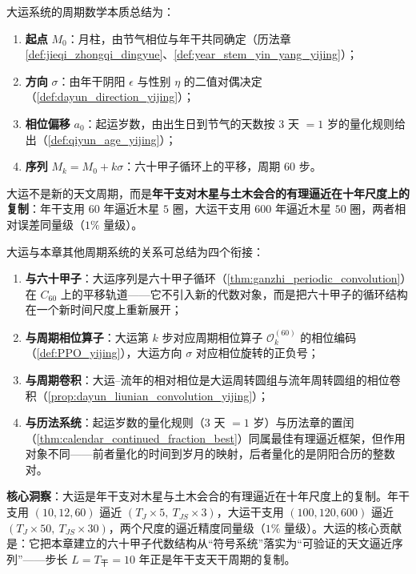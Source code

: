 \begin{remark}[大运系统的周期数学本质]\label{rem:dayun_math_essence_yijing}
大运系统的周期数学本质总结为：
\begin{enumerate}[label=(\roman*)]
    \item \textbf{起点} $M_0$：月柱，由节气相位与年干共同确定（历法章 \cref{def:jieqi_zhongqi_dingyue}、\cref{def:year_stem_yin_yang_yijing}）；
    \item \textbf{方向} $\sigma$：由年干阴阳 $\epsilon$ 与性别 $\eta$ 的二值对偶决定（\cref{def:dayun_direction_yijing}）；
    \item \textbf{相位偏移} $a_0$：起运岁数，由出生日到节气的天数按 $3$ 天 $=1$ 岁的量化规则给出（\cref{def:qiyun_age_yijing}）；
    \item \textbf{序列} $M_k=M_0+k\sigma$：六十甲子循环上的平移，周期 $60$ 步。
\end{enumerate}
大运不是新的天文周期，而是\textbf{年干支对木星与土木会合的有理逼近在十年尺度上的复制}：年干支用 $60$ 年逼近木星 $5$ 圈，大运干支用 $600$ 年逼近木星 $50$ 圈，两者相对误差同量级（$1\%$ 量级）。
\end{remark}

\begin{remark}[大运与本章其他周期体系的衔接]\label{rem:dayun_relation_to_yijing}
大运与本章其他周期系统的关系可总结为四个衔接：
\begin{enumerate}[label=(\roman*)]
    \item \textbf{与六十甲子}：大运序列是六十甲子循环（\cref{thm:ganzhi_periodic_convolution}）在 $C_{60}$ 上的平移轨道——它不引入新的代数对象，而是把六十甲子的循环结构在一个新时间尺度上重新展开；
    \item \textbf{与周期相位算子}：大运第 $k$ 步对应周期相位算子 $\mathcal O_k^{(60)}$ 的相位编码（\cref{def:PPO_yijing}），大运方向 $\sigma$ 对应相位旋转的正负号；
    \item \textbf{与周期卷积}：大运--流年的相对相位是大运周转圆组与流年周转圆组的相位卷积（\cref{prop:dayun_liunian_convolution_yijing}）；
    \item \textbf{与历法系统}：起运岁数的量化规则（$3$ 天 $=1$ 岁）与历法章的置闰（\cref{thm:calendar_continued_fraction_best}）同属最佳有理逼近框架，但作用对象不同——前者量化的时间到岁月的映射，后者量化的是阴阳合历的整数对。
\end{enumerate}

\textbf{核心洞察}：大运是年干支对木星与土木会合的有理逼近在十年尺度上的复制。年干支用 $(10,12,60)$ 逼近 $(T_J\times 5,\ T_{JS}\times 3)$，大运干支用 $(100,120,600)$ 逼近 $(T_J\times 50,\ T_{JS}\times 30)$，两个尺度的逼近精度同量级（$1\%$ 量级）。大运的核心贡献是：它把本章建立的六十甲子代数结构从“符号系统”落实为“可验证的天文逼近序列”——步长 $L=T_{\text{干}}=10$ 年正是年干支天干周期的复制。
\end{remark}

